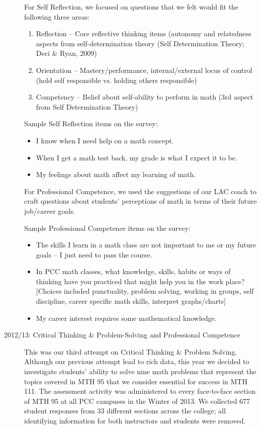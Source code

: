 \begin{description}
For Self Reflection, we focused on questions that we felt would fit the following three areas:
\begin{enumerate}
\item Reflection -- Core reflective thinking items (autonomy and relatedness aspects from self-determination theory (Self Determination Theory;  Deci \& Ryan, 2009)
\item Orientation -- Mastery/performance, internal/external locus of control (hold self responsible vs. holding others responsible)
\item Competency -- Belief about self-ability to perform in math (3rd aspect from Self Determination Theory) 
\end{enumerate}
Sample Self Reflection items on the survey:
\begin{itemize}
\item I know when I need help on a math concept.
\item When I get a math test back, my grade is what I expect it to be.
\item My feelings about math affect my learning of math.
\end{itemize}

For Professional Competence, we used the suggestions of our LAC coach to craft questions about students' perceptions of math in terms of their future job/career goals. 

Sample Professional Competence items on the survey:
\begin{itemize}
\item The skills I learn in a math class are not important to me or my future goals -- I just need to pass the course.
\item In PCC math classes, what knowledge, skills, habits or ways of thinking have you practiced that might help you in the work place? [Choices included punctuality, problem solving, working in groups, self discipline, career specific math skills, interpret graphs/charts]
\item My career interest requires some mathematical knowledge.
\end{itemize}

\item[2012/13:  Critical Thinking \& Problem-Solving and Professional Competence]

This was our third attempt on Critical Thinking \& Problem Solving.  Although our previous attempt lead to rich data, this year we decided to investigate students' ability to solve nine math problems that represent the topics covered in MTH 95 that we consider essential for success in MTH 111.  The assessment activity was administered to every face-to-face section of MTH 95 at all PCC campuses in the Winter of 2013.  We collected 677 student responses from 33 different sections across the college; all identifying information for both instructors and students were removed.


\end{description}

